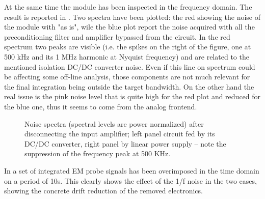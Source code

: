 At the same time the module has been inspected in the frequency domain. The result is reported in \Figure{\ref{fig:noise_spectra_a}}.
Two spectra have been plotted: the red showing the noise of the module with "as is", wile the blue plot report the noise acquired with all the preconditioning filter and amplifier bypassed from the circuit.
In the red spectrum two peaks are visible (i.e. the spikes on the right of the figure, one at 500 kHz and its 1 MHz harmonic at Nyquist frequency) and are related to the mentioned isolation DC/DC converter noise. Even if this line on spectrum could be affecting some off-line analysis, those components are not much relevant for the final integration being outside the target bandwidth. On the other hand the real issue is the pink noise level that is quite high for the red plot and reduced for the blue one, thus it seems to come from the analog frontend.
%
\begin{figure}[ht]
\centering
{}
\caption{Noise spectra (spectral levels are power normalized) after disconnecting the input amplifier; left panel circuit fed by its DC/DC converter, right panel by linear power supply – note the suppression of the frequency peak at 500 KHz.}
\label{fig:noise_spectra}
\end{figure}
In \Figure{\ref{fig:noise_drift_b}} a set of integrated EM probe signals has been overimposed in the time domain on a period of 10s. This clearly shows the effect of the 1/f noise in the two cases, showing the concrete drift reduction of the removed electronics.
%
